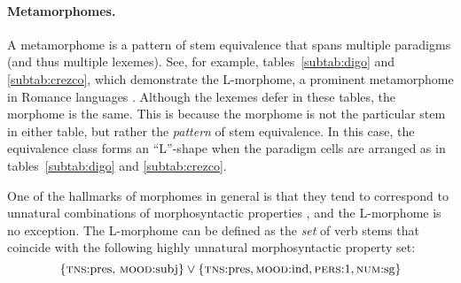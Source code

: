 {\paragraph{Metamorphomes.} A metamorphome is a pattern of stem 
equivalence that spans multiple paradigms 
(and thus multiple lexemes). See, for example, tables~\ref{subtab:digo}
and \ref{subtab:crezco}, which demonstrate the L-morphome, a prominent 
metamorphome in Romance languages \citep{maiden:2005}. Although the 
lexemes defer in these tables, the morphome is the same. This is because 
the morphome is not the particular stem in either table, but rather the 
\emph{pattern} of stem equivalence. In this case, the equivalence class 
forms  an ``L''-shape when the paradigm cells are arranged as in tables~\ref{subtab:digo} 
and \ref{subtab:crezco}.
\begin{table}[t]\label{tab:l-morphome}
 \setlength{\extrarowheight}{6pt}
\centering %
\vspace{7pt}
\caption{The stem \textit{crezc-} `say' is an L-morphome in Spanish.}
\end{table}

One of the hallmarks of morphomes in general is that they tend to
correspond to unnatural combinations of morphosyntactic 
properties \citep{aronoff:md:2016}, and the L-morphome is no exception. 
The L-morphome can be defined as the \emph{set} of verb 
stems that coincide with the following highly unnatural morphosyntactic property set:
\begin{equation}
\{ \text{\textsc{tns}:pres, \textsc{mood}:subj}\} \vee \{\text{\textsc{tns}:pres},\text{\textsc{mood}:ind},\text{\textsc{pers}:1},\text{\textsc{num}:sg}\}
\end{equation}

}
